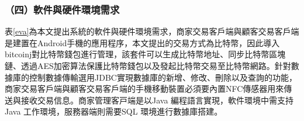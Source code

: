 	\subsubsection{（四）軟件與硬件環境需求}
	表\ref{eva}為本文提出系統的軟件與硬件環境需求，商家交易客戶端與顧客交易客戶端是建置在Android手機的應用程序，本文提出的交易方式為比特幣，因此導入bitcoinj\supercite{Bitcoinclients}對比特幣錢包進行管理，該套件可以生成比特幣地址、同步比特幣區塊鏈、透過AES加密算法保護比特幣錢包以及發起比特幣交易至比特幣網路。針對數據庫的控制數據傳輸選用JDBC\supercite{JDBCdatabaseaccesswithJava:atutorialandannotatedreference}實現數據庫的新增、修改、刪除以及查詢的功能，商家交易客戶端與顧客交易客戶端的手機移動裝置必須要內置NFC傳感器用來傳送與接收交易信息。商家管理客⼾端是以Java 編程語⾔實現，軟件環境中需⽀持Java ⼯作環境，服務器端則需要SQL 環境進行數據庫搭建。


